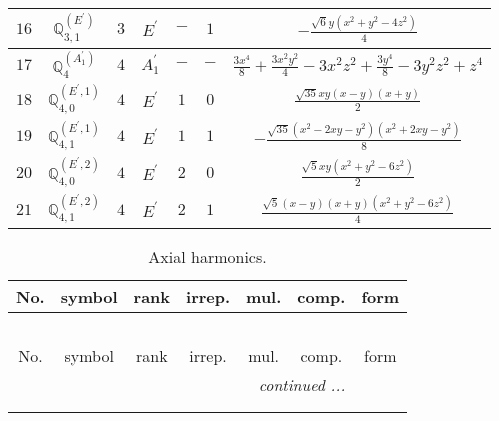 \documentclass[fleqn,10pt,landscape]{article}
\begin{document}
\begin{itemize}
\begin{center}
\begin{longtable}{ccccccc}
$ 16 $ & $ \mathbb{Q}_{3,1}^{(E^{\prime})} $ & $ 3 $ & $ E^{\prime} $ & $ - $ & $ 1 $ & $ - \frac{\sqrt{6} y \left(x^{2} + y^{2} - 4 z^{2}\right)}{4} $ \\ \hline
$ 17 $ & $ \mathbb{Q}_{4}^{(A_{1}^{\prime})} $ & $ 4 $ & $ A_{1}^{\prime} $ & $ - $ & $ - $ & $ \frac{3 x^{4}}{8} + \frac{3 x^{2} y^{2}}{4} - 3 x^{2} z^{2} + \frac{3 y^{4}}{8} - 3 y^{2} z^{2} + z^{4} $ \\
$ 18 $ & $ \mathbb{Q}_{4,0}^{(E^{\prime},1)} $ & $ 4 $ & $ E^{\prime} $ & $ 1 $ & $ 0 $ & $ \frac{\sqrt{35} x y \left(x - y\right) \left(x + y\right)}{2} $ \\
$ 19 $ & $ \mathbb{Q}_{4,1}^{(E^{\prime},1)} $ & $ 4 $ & $ E^{\prime} $ & $ 1 $ & $ 1 $ & $ - \frac{\sqrt{35} \left(x^{2} - 2 x y - y^{2}\right) \left(x^{2} + 2 x y - y^{2}\right)}{8} $ \\
$ 20 $ & $ \mathbb{Q}_{4,0}^{(E^{\prime},2)} $ & $ 4 $ & $ E^{\prime} $ & $ 2 $ & $ 0 $ & $ \frac{\sqrt{5} x y \left(x^{2} + y^{2} - 6 z^{2}\right)}{2} $ \\
$ 21 $ & $ \mathbb{Q}_{4,1}^{(E^{\prime},2)} $ & $ 4 $ & $ E^{\prime} $ & $ 2 $ & $ 1 $ & $ \frac{\sqrt{5} \left(x - y\right) \left(x + y\right) \left(x^{2} + y^{2} - 6 z^{2}\right)}{4} $ \\
\end{longtable}
\end{center}
\begin{center}
\renewcommand{\arraystretch}{1.3}
\begin{longtable}{ccccccc}
\caption{Axial harmonics.}
 \\
 \hline \hline
No. & symbol & rank & irrep. & mul. & comp. & form \\ \hline \endfirsthead

\multicolumn{6}{l}{\tablename\ \thetable{}} \\
 \hline \hline
No. & symbol & rank & irrep. & mul. & comp. & form \\ \hline \endhead

 \hline \hline
\multicolumn{6}{r}{\footnotesize\it continued ...} \\ \endfoot

 \hline \hline
\multicolumn{6}{r}{} \\ \endlastfoot


\end{longtable}
\end{center}
\end{itemize}
\end{document}
